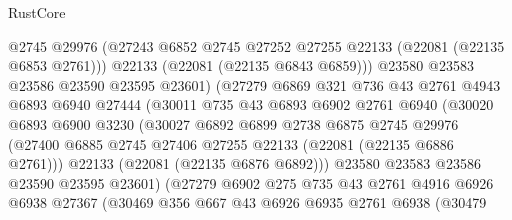 \begin{lexlean}{RustCore}
\begin{coremodule}
                          @2745
                          @29976
                          (@27243 @6852 @2745 @27252 @27255 @22133 (@22081 (@22135 @6853 @2761)))
                          @22133
                          (@22081 (@22135 @6843 @6859)))
                        @23580
                        @23583
                        @23586
                        @23590
                        @23595
                        @23601)
                      (@27279
                        @6869
                        @321
                        @736
                        @43
                        @2761
                        @4943
                        @6893
                        @6940
                        @27444
                        (@30011
                          @735
                          @43
                          @6893
                          @6902
                          @2761
                          @6940
                          (@30020
                            @6893
                            @6900
                            @3230
                            (@30027
                              @6892
                              @6899
                              @2738
                              @6875
                              @2745
                              @29976
                              (@27400
                                @6885
                                @2745
                                @27406
                                @27255
                                @22133
                                (@22081 (@22135 @6886 @2761)))
                              @22133
                              (@22081 (@22135 @6876 @6892)))
                            @23580
                            @23583
                            @23586
                            @23590
                            @23595
                            @23601)
                          (@27279
                            @6902
                            @275
                            @735
                            @43
                            @2761
                            @4916
                            @6926
                            @6938
                            @27367
                            (@30469
                              @356
                              @667
                              @43
                              @6926
                              @6935
                              @2761
                              @6938
                              (@30479

\end{coremodule}
\end{lexlean}
